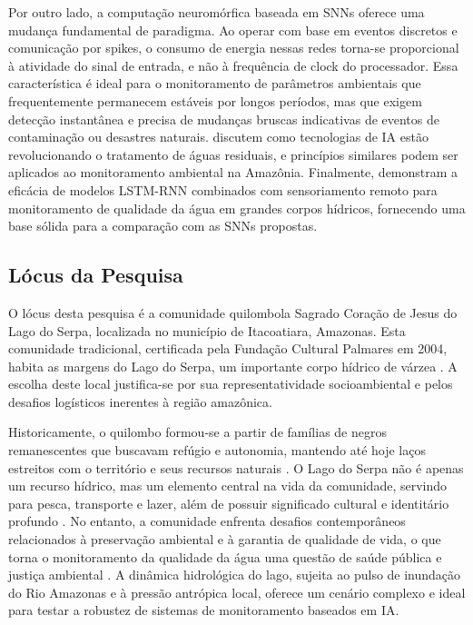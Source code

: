 \documentclass[twoside]{article}
\begin{document}
Por outro lado, a computação neuromórfica baseada em SNNs oferece uma
mudança fundamental de paradigma.
Ao operar com base em eventos discretos e comunicação por spikes, o
consumo de energia nessas redes torna-se proporcional à atividade do
sinal de entrada, e não à frequência de clock do processador.
Essa característica é ideal para o monitoramento de parâmetros
ambientais que frequentemente permanecem estáveis por longos períodos,
mas que exigem detecção instantânea e precisa de mudanças bruscas
indicativas de eventos de contaminação ou desastres naturais.
 discutem como tecnologias de IA estão
revolucionando o tratamento de águas residuais, e princípios similares
podem ser aplicados ao monitoramento ambiental na Amazônia.
Finalmente,  demonstram a eficácia de modelos
LSTM-RNN combinados com sensoriamento remoto para monitoramento de
qualidade da água em grandes corpos hídricos, fornecendo uma base sólida
para a comparação com as SNNs propostas.

\FloatBarrier
\subsection{Lócus da Pesquisa}

O lócus desta pesquisa é a comunidade quilombola Sagrado Coração de Jesus do Lago do Serpa,
localizada no município de Itacoatiara, Amazonas. Esta comunidade tradicional, certificada 
pela Fundação Cultural Palmares em 2004, habita as margens do Lago do Serpa, um importante 
corpo hídrico de várzea \cite{clemente2018}. A escolha deste local justifica-se por 
sua representatividade socioambiental e pelos desafios logísticos inerentes à 
região amazônica.

Historicamente, o quilombo formou-se a partir de famílias de negros remanescentes
que buscavam refúgio e autonomia, mantendo até hoje laços estreitos com o território
e seus recursos naturais \cite{nogueira2022}. O Lago do Serpa não é apenas 
um recurso hídrico, mas um elemento central na vida da comunidade, servindo para pesca, 
transporte e lazer, além de possuir significado cultural e identitário profundo 
\cite{clemente2018}. No entanto, a comunidade enfrenta desafios contemporâneos 
relacionados à preservação ambiental e à garantia de qualidade de vida, o que torna o 
monitoramento da qualidade da água uma questão de saúde pública e justiça ambiental 
\cite{nogueira2022}. A dinâmica hidrológica do lago, sujeita ao pulso de 
inundação do Rio Amazonas e à pressão antrópica local, oferece um cenário complexo e 
ideal para testar a robustez de sistemas de monitoramento baseados em IA.
\end{document}
